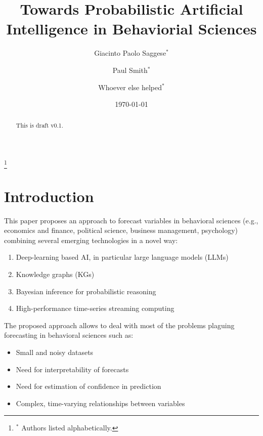 \documentclass[11pt, reqno]{amsart}
\theoremstyle{definition}
\theoremstyle{remark}
\begin{document}
  \title{Towards Probabilistic Artificial Intelligence in Behaviorial Sciences}

  \author{Giacinto Paolo Saggese$^{*}$}
  \author{Paul Smith$^{*}$}
  \author{Whoever else helped$^{*}$}
  \thanks{$^{*}$ Authors listed alphabetically.}

  \date{\today}

  \begin{abstract}
    This is draft v0.1.
  \end{abstract}

  \maketitle

  \setcounter{tocdepth}{2}
  \tableofcontents

  \section{Introduction}

  This paper proposes an approach to forecast variables in behavioral sciences
  (e.g., economics and finance, political science, business management,
  psychology) combining several emerging technologies in a novel way:
  \begin{enumerate}
    \item Deep-learning based AI, in particular large language models (LLMs)

    \item Knowledge graphs (KGs)

    \item Bayesian inference for probabilistic reasoning

    \item High-performance time-series streaming computing
  \end{enumerate}

  The proposed approach allows to deal with most of the problems plaguing
  forecasting in behavioral sciences such as:
  \begin{itemize}
    \item Small and noisy datasets

    \item Need for interpretability of forecasts

    \item Need for estimation of confidence in prediction

    \item Complex, time-varying relationships between variables
  \end{itemize}
\end{document}
